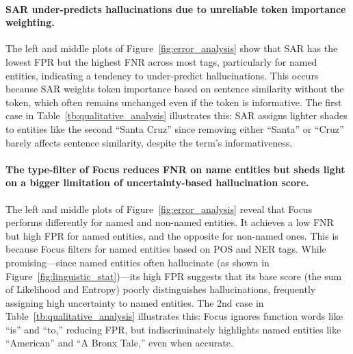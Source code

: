 

\vspace{-0.1cm}
\paragraph{SAR under-predicts hallucinations due to unreliable token importance weighting.}
The left and middle plots of Figure~\ref{fig:error_analysis} show that SAR has the lowest FPR but the highest FNR across most tags, particularly for named entities, indicating a tendency to under-predict hallucinations. This occurs because SAR weights token importance based on sentence similarity without the token, which often remains unchanged even if the token is informative. The first case in Table~\ref{tb:qualitative_analysis} illustrates this: SAR assigns lighter shades to entities like the second ``Santa Cruz'' since removing either ``Santa'' or ``Cruz'' barely affects sentence similarity, despite the term's informativeness.



\vspace{-0.1cm}
\paragraph{The type-filter of Focus reduces FNR on name entities but sheds light on a bigger limitation of uncertainty-based hallucination score.}
The left and middle plots of Figure~\ref{fig:error_analysis} reveal that Focus performs differently for named and non-named entities. It achieves a low FNR but high FPR for named entities, and the opposite for non-named ones. This is because Focus filters for named entities based on POS and NER tags. While promising---since named entities often hallucinate (as shown in Figure~\ref{fig:linguistic_stat})---its high FPR suggests that its base score (the sum of Likelihood and Entropy) poorly distinguishes hallucinations, frequently assigning high uncertainty to named entities. The 2nd case in Table~\ref{tb:qualitative_analysis} illustrates this: Focus ignores function words like ``is'' and ``to,'' reducing FPR, but indiscriminately highlights named entities like ``American'' and ``A Bronx Tale,'' even when accurate.


\vspace{-0.1cm}
